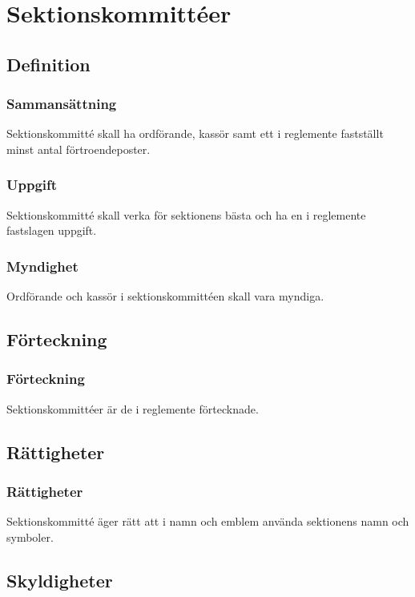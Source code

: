 \section{Sektionskommittéer}

\subsection{Definition}

\subsubsection{Sammansättning}
Sektionskommitté skall ha ordförande, kassör samt ett i reglemente fastställt minst antal förtroendeposter.

\subsubsection{Uppgift}
Sektionskommitté skall verka för sektionens bästa och ha en i reglemente fastslagen uppgift.

\subsubsection{Myndighet}
Ordförande och kassör i sektionskommittéen skall vara myndiga.

\subsection{Förteckning}

\subsubsection{Förteckning}
Sektionskommittéer är de i reglemente förtecknade.

\subsection{Rättigheter}

\subsubsection{Rättigheter}
Sektionskommitté äger rätt att i namn och emblem använda sektionens namn och symboler.

\subsection{Skyldigheter}

